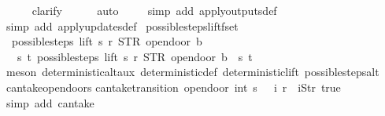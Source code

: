 \begin{isabellebody}
\ \ \ \ \isamarkupfalse%
\ clarify\isanewline
\ \ \ \ \isamarkupfalse%
\ auto{\isacharbrackleft}{}{\isacharbrackright}\isanewline
\ \ \ \isamarkupfalse%
\ {\isacharparenleft}simp\ add{\isacharcolon}\ apply{\isacharunderscore}outputs{\isacharunderscore}def{\isacharparenright}\isanewline
\ \ \isamarkupfalse%
\ {\isacharparenleft}simp\ add{\isacharcolon}\ apply{\isacharunderscore}updates{\isacharunderscore}def{\isacharparenright}%
\endisatagproof
{\isafoldproof}%
%
\isadelimproof
\isanewline
%
\endisadelimproof
\isanewline
{}\isamarkupfalse%
\ possible{\isacharunderscore}steps{\isacharunderscore}lift{\isacharunderscore}fset{\isacharcolon}\isanewline
\ \ {\isachardoublequoteopen}possible{\isacharunderscore}steps\ lift\ s\ r\ STR\ {\isacharprime}{\isacharprime}opendoor{\isacharprime}{\isacharprime}\ b\ {\isasymnoteq}\ {\isacharbraceleft}{\isacharbar}{\isacharbar}{\isacharbraceright}\ {\isasymLongrightarrow}\isanewline
\ \ \ {\isasymexists}s{\isacharprime}\ t{\isachardot}\ possible{\isacharunderscore}steps\ lift\ s\ r\ STR\ {\isacharprime}{\isacharprime}opendoor{\isacharprime}{\isacharprime}\ b\ {\isacharequal}\ {\isacharbraceleft}{\isacharbar}{\isacharparenleft}s{\isacharprime}{\isacharcomma}\ t{\isacharparenright}{\isacharbar}{\isacharbraceright}{\isachardoublequoteclose}\isanewline
%
\isadelimproof
\ \ %
\endisadelimproof
%
\isatagproof
{}\isamarkupfalse%
\ {\isacharparenleft}meson\ deterministic{\isacharunderscore}alt{\isacharunderscore}aux\ deterministic{\isacharunderscore}def\ deterministic{\isacharunderscore}lift\ possible{\isacharunderscore}steps{\isacharunderscore}alt{\isacharparenright}%
\endisatagproof
{\isafoldproof}%
%
\isadelimproof
\isanewline
%
\endisadelimproof
\isanewline
{}\isamarkupfalse%
\ can{\isacharunderscore}take{\isacharunderscore}opendoors{\isacharcolon}\isanewline
{\isachardoublequoteopen}can{\isacharunderscore}take{\isacharunderscore}transition\ {\isacharparenleft}opendoor\ {\isacharparenleft}int\ {\isacharparenleft}s\ {\isacharminus}\ {}{\isacharparenright}{\isacharparenright}{\isacharparenright}\ i\ r\ {\isacharequal}\ {\isacharparenleft}i{\isacharequal}{\isacharbrackleft}Str\ {\isacharprime}{\isacharprime}true{\isacharprime}{\isacharprime}{\isacharbrackright}{\isacharparenright}{\isachardoublequoteclose}\isanewline
%
\isadelimproof
\ \ %
\endisadelimproof
%
\isatagproof
{}\isamarkupfalse%
\ {\isacharparenleft}simp\ add{\isacharcolon}\ can{\isacharunderscore}take{\isacharparenright}\isanewline

\end{isabellebody}
